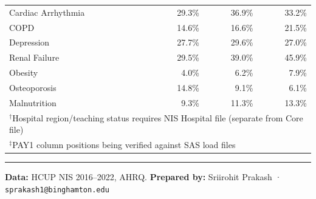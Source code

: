 \documentclass[11pt,letterpaper]{article}
\begin{document}
\begin{center}
\begin{tabular}{lrrr}
Cardiac Arrhythmia  & 29.3\% & 36.9\% & 33.2\% \\
COPD                & 14.6\% & 16.6\% & 21.5\% \\
Depression          & 27.7\% & 29.6\% & 27.0\% \\
Renal Failure       & 29.5\% & 39.0\% & 45.9\% \\
Obesity             & 4.0\%  & 6.2\%  & 7.9\% \\
Osteoporosis        & 14.8\% & 9.1\%  & 6.1\% \\
Malnutrition        & 9.3\%  & 11.3\% & 13.3\% \\
\bottomrule
\multicolumn{4}{l}{\small $^{\dagger}$Hospital region/teaching status requires NIS Hospital file (separate from Core file)} \\
\multicolumn{4}{l}{\small $^{\ddagger}$PAY1 column positions being verified against SAS load files} \\
\end{tabular}
\end{center}

\vspace{0.4cm}
\noindent\rule{\textwidth}{0.4pt}
\small
\noindent \textbf{Data:} HCUP NIS 2016--2022, AHRQ.
\textbf{Prepared by:} Sriirohit Prakash · \texttt{sprakash1@binghamton.edu}
\end{document}
